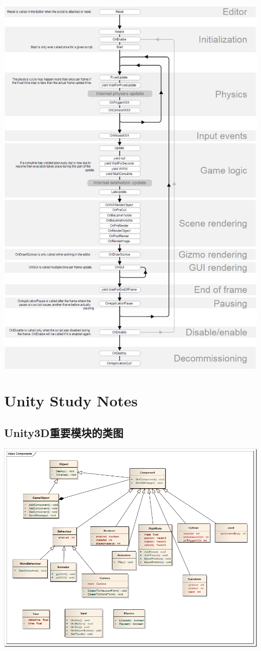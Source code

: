 \documentclass[9pt, b5paper]{article}
\begin{document}
\begin{center}
\includegraphics[width=.9\linewidth]{./pic/lifecyclefunc.png}
\end{center}

\section{Unity Study Notes}
\label{sec:orgf0b614c}
\subsection{Unity3D重要模块的类图}
\label{sec:org98ba0e8}
\begin{center}
\includegraphics[width=.9\linewidth]{./pic/classes.png}
\end{center}
\end{document}
